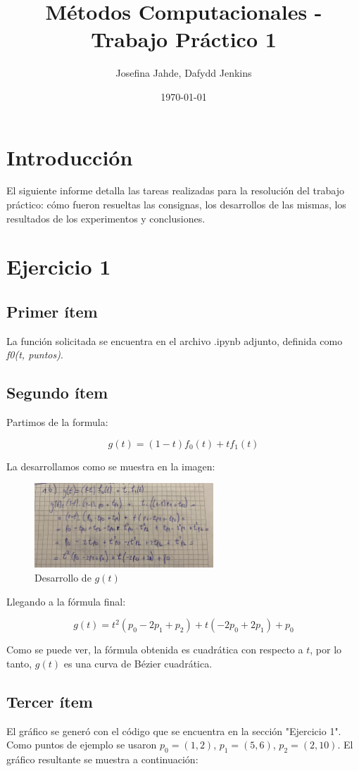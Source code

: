 \documentclass{article}
\title{Métodos Computacionales - Trabajo Práctico 1}
\author{Josefina Jahde, Dafydd Jenkins}
\date{\today}
\begin{document}
\maketitle

\section*{Introducción}
El siguiente informe detalla las tareas realizadas para la resolución del trabajo práctico: cómo fueron resueltas las consignas, los desarrollos de las mismas, los resultados de los experimentos y conclusiones.


\section*{Ejercicio 1}
\subsection*{Primer ítem}
La función solicitada se encuentra en el archivo .ipynb adjunto, definida como \textit{f0(t, puntos)}.
\subsection*{Segundo ítem}
Partimos de la formula:

$$
g(t) = (1 - t)f_0(t) + t f_1(t)
$$

La desarrollamos como se muestra en la imagen:

\begin{figure}[H]
    \centering
    \includegraphics[width=0.6\textwidth]{imagenes/1b.jpg}
    \caption{Desarrollo de $g(t)$}
    \label{fig:ejemplo}
\end{figure}

Llegando a la fórmula final:

$$
g(t) = t^2 (p_0 - 2 p_1 + p_2) + t (-2 p_0 + 2 p_1) + p_0
$$

Como se puede ver, la fórmula obtenida es cuadrática con respecto a $t$, por lo tanto, $g(t)$ es una curva de Bézier cuadrática.
\subsection*{Tercer ítem}
El gráfico se generó con el código que se encuentra en la sección "Ejercicio 1". Como puntos de ejemplo se usaron $p_0 = (1, 2)$, $p_1 = (5, 6)$, $p_2 = (2, 10)$. El gráfico resultante se muestra  a continuación:
\end{document}
